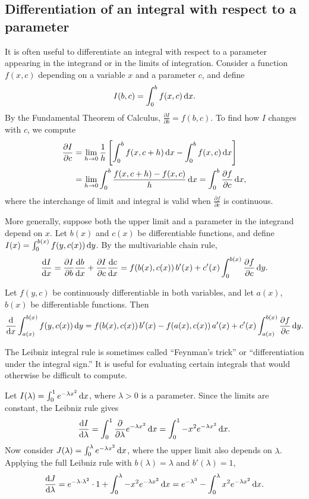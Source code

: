 \documentclass[a4paper]{article}
\begin{document}
\subsection{Differentiation of an integral with respect to a parameter}
It is often useful to differentiate an integral with respect to a parameter appearing in the integrand or in the limits of integration. Consider a function $f(x, c)$ depending on a variable $x$ and a parameter $c$, and define
\[
  I(b, c) = \int_0^b f(x, c)\,\mathrm{d} x.
\]
By the Fundamental Theorem of Calculus, $\frac{\partial I}{\partial b} = f(b, c)$. To find how $I$ changes with $c$, we compute
\begin{align*}
  \frac{\partial I}{\partial c} &= \lim_{h\to 0}\frac{1}{h}\left[\int_0^bf(x, c + h)\,\mathrm{d} x - \int_0^b f(x, c)\,\mathrm{d} x\right]\\
  &= \lim_{h\to 0}\int_0^b\frac{f(x, c + h) - f(x, c)}{h}\,\mathrm{d} x = \int_0^b\frac{\partial f}{\partial c}\,\mathrm{d} x,
\end{align*}
where the interchange of limit and integral is valid when $\frac{\partial f}{\partial c}$ is continuous.

More generally, suppose both the upper limit and a parameter in the integrand depend on $x$. Let $b(x)$ and $c(x)$ be differentiable functions, and define $I(x) = \int_0^{b(x)} f(y, c(x))\,\mathrm{d} y$. By the multivariable chain rule,
\[
  \frac{\mathrm{d} I}{\mathrm{d} x} = \frac{\partial I}{\partial b}\frac{\mathrm{d} b}{\mathrm{d} x} + \frac{\partial I}{\partial c}\frac{\mathrm{d} c}{\mathrm{d} x} = f(b(x), c(x))\,b'(x) + c'(x) \int_0^{b(x)}\frac{\partial f}{\partial c}\,\mathrm{d} y.
\]

\begin{thm}
  Let $f(y, c)$ be continuously differentiable in both variables, and let $a(x)$, $b(x)$ be differentiable functions. Then
  \[
    \frac{\mathrm{d}}{\mathrm{d} x} \int_{a(x)}^{b(x)} f(y, c(x))\,\mathrm{d} y = f(b(x), c(x))\,b'(x) - f(a(x), c(x))\,a'(x) + c'(x)\int_{a(x)}^{b(x)} \frac{\partial f}{\partial c}\,\mathrm{d} y.
  \]
\end{thm}

\begin{remark}
  The Leibniz integral rule is sometimes called ``Feynman's trick'' or ``differentiation under the integral sign.'' It is useful for evaluating certain integrals that would otherwise be difficult to compute.
\end{remark}

\begin{eg}
  Let $I(\lambda) = \int_0^1 e^{-\lambda x^2}\,\mathrm{d} x$, where $\lambda > 0$ is a parameter. Since the limits are constant, the Leibniz rule gives
  \[
    \frac{\mathrm{d} I}{\mathrm{d} \lambda} = \int_0^1 \frac{\partial}{\partial \lambda}e^{-\lambda x^2}\,\mathrm{d} x = \int_0^1 -x^2 e^{-\lambda x^2}\,\mathrm{d} x.
  \]
  Now consider $J(\lambda) = \int_0^\lambda e^{-\lambda x^2}\,\mathrm{d} x$, where the upper limit also depends on $\lambda$. Applying the full Leibniz rule with $b(\lambda) = \lambda$ and $b'(\lambda) = 1$,
  \[
    \frac{\mathrm{d} J}{\mathrm{d} \lambda} = e^{-\lambda \cdot \lambda^2} \cdot 1 + \int_0^{\lambda} -x^2 e^{-\lambda x^2}\,\mathrm{d} x = e^{-\lambda^3} - \int_0^{\lambda} x^2 e^{-\lambda x^2}\,\mathrm{d} x.
  \]
\end{eg}
\end{document}
